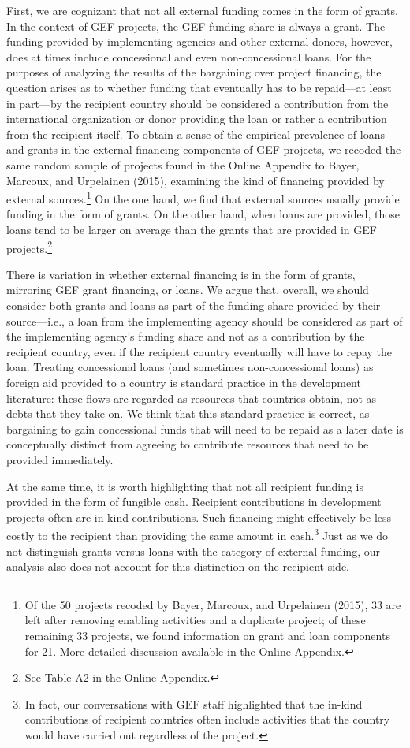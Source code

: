 \documentclass{article}
\begin{document}
First, we are cognizant that not all external funding comes in the form of grants. In the context of GEF projects, the GEF funding share is always a grant. The funding provided by implementing agencies and other external donors, however, does at times include concessional and even non-concessional loans. For the purposes of analyzing the results of the bargaining over project financing, the question arises as to whether funding that eventually has to be repaid---at least in part---by the recipient country should be considered a contribution from the international organization or donor providing the loan or rather a contribution from the recipient itself. To obtain a sense of the empirical prevalence of loans and grants in the external financing components of GEF projects, we recoded the same random sample of projects found in the Online Appendix to Bayer, Marcoux, and Urpelainen (2015), examining the kind of financing provided by external sources.\footnote{Of the 50 projects recoded by Bayer, Marcoux, and Urpelainen (2015), 33 are left after removing enabling activities and a duplicate project; of these remaining 33 projects, we found information on grant and loan components for 21. More detailed discussion available in the Online Appendix.}  On the one hand, we find that external sources usually provide funding in the form of grants. On the other hand, when loans are provided, those loans tend to be larger on average than the grants that are provided in GEF projects.\footnote{See Table A2 in the Online Appendix.}
  
There is variation in whether external financing is in the form of grants, mirroring GEF grant financing, or loans.  We argue that, overall, we should consider both grants and loans as part of the funding share provided by their source---i.e., a loan from the implementing agency should be considered as part of the implementing agency’s funding share and not as a contribution by the recipient country, even if the recipient country eventually will have to repay the loan.  Treating concessional loans (and sometimes non-concessional loans) as foreign aid provided to a country is standard practice in the development literature: these flows are regarded as resources that countries obtain, not as debts that they take on.  We think that this standard practice is correct, as bargaining to gain concessional funds that will need to be repaid as a later date is conceptually distinct from agreeing to contribute resources that need to be provided immediately. 

At the same time, it is worth highlighting that not all recipient funding is provided in the form of fungible cash.  Recipient contributions in development projects often are in-kind contributions.  Such financing might effectively be less costly to the recipient than providing the same amount in cash.\footnote{In fact, our conversations with GEF staff highlighted that the in-kind contributions of recipient countries often include activities that the country would have carried out regardless of the project.}  Just as we do not distinguish grants versus loans with the category of external funding, our analysis also does not account for this distinction on the recipient side.
\end{document}
